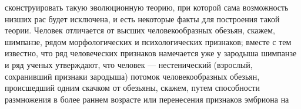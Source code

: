 сконструировать такую эволюционную теорию, при которой сама возможность низших рас будет исключена, и есть некоторые факты для построения такой теории. Человек отличается от высших человекообразных обезьян, скажем, шимпанзе, рядом морфологических и психологических признаков; вместе с тем известно, что ряд человеческих признаков намечается уже у зародыша шимпанзе и ряд ученых утверждают, что человек — нестенический (взрослый, сохранивший признаки зародыша) потомок человекообразных обезьян, происшедший одним скачком от обезьяны, скажем, путем способности размножения в более раннем возрасте или перенесения признаков эмбриона на


